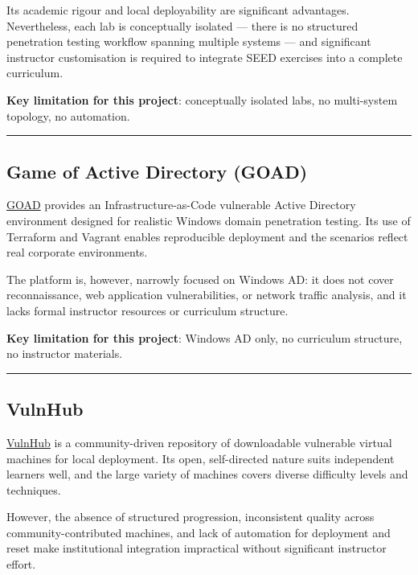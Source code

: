 Its academic rigour and local deployability are significant advantages. Nevertheless, each lab is conceptually isolated --- there is no structured penetration testing workflow spanning multiple systems --- and significant instructor customisation is required to integrate SEED exercises into a complete curriculum.

\textbf{Key limitation for this project}: conceptually isolated labs, no multi-system topology, no automation.

\begin{center}\rule{0.5\linewidth}{0.5pt}\end{center}

\subsection{Game of Active Directory (GOAD)}

\href{https://github.com/Orange-Cyberdefense/GOAD}{GOAD} provides an Infrastructure-as-Code vulnerable Active Directory environment designed for realistic Windows domain penetration testing. Its use of Terraform and Vagrant enables reproducible deployment and the scenarios reflect real corporate environments.

The platform is, however, narrowly focused on Windows AD: it does not cover reconnaissance, web application vulnerabilities, or network traffic analysis, and it lacks formal instructor resources or curriculum structure.

\textbf{Key limitation for this project}: Windows AD only, no curriculum structure, no instructor materials.

\begin{center}\rule{0.5\linewidth}{0.5pt}\end{center}

\subsection{VulnHub}

\href{https://www.vulnhub.com/}{VulnHub} is a community-driven repository of downloadable vulnerable virtual machines for local deployment. Its open, self-directed nature suits independent learners well, and the large variety of machines covers diverse difficulty levels and techniques.

However, the absence of structured progression, inconsistent quality across community-contributed machines, and lack of automation for deployment and reset make institutional integration impractical without significant instructor effort.


